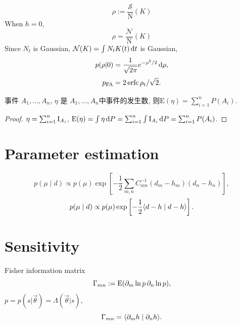 \begin{equation}
    \rho:=\frac{\mathcal{S}}{\mathrm{N}}(K)
\end{equation}
When $h=0$,
\begin{equation}
    \rho=\frac{\mathcal{N}}{\mathrm{N}}(K)
\end{equation}
Since $N_t$ is Gaussian, $\mathcal{N}(K)=\int N_tK(t)\,\mathrm{d} t$ is Gaussian,
\begin{equation}
    p(\rho|0)=\frac{1}{\sqrt{2\pi}}e^{-\rho^2/2}\,\mathrm{d}\rho,
\end{equation}
\begin{equation}
    p_{\text{FA}}=2\operatorname{erfc}{\rho_\text{t}/\sqrt{2}}.
\end{equation}
\begin{theorem}
    事件 $A_1,\dots,A_n$, $\eta$ 是 $A_1,\dots,A_n$中事件的发生数, 则$\text{E}(\eta)=\sum_{i=1}^nP(A_i)$.
\end{theorem}
\begin{proof}
    $\eta=\sum_{i=1}^n\text{I}_{A_i}$, $\text{E}(\eta)=\int\eta\,\mathrm{d} P=\sum_{i=1}^n\int\text{I}_{A_i}\,\mathrm{d} P=\sum_{i=1}^nP(A_i)$.
\end{proof}

\section{Parameter estimation}

\begin{equation}
    p(\mu\mid d)\propto p(\mu)\exp\left[-\frac{1}{2}\sum_{m,n}C_{mn}^{-1}(d_m-h_m)(d_n-h_n)\right],
\end{equation}
\begin{equation}
    p(\mu\mid d)\propto p(\mu)\exp\left[-\frac{1}{2}\langle d-h\mid d-h \rangle\right].
\end{equation}

\section{Sensitivity}

Fisher information matrix
\begin{equation}
    \Gamma_{mn}:=\text{E}(\partial_m \ln p\,\partial_n \ln p),
\end{equation}
$p=p(s|\vec{\theta})=\Lambda(\vec{\theta}|s)$,
\begin{equation}
    \Gamma_{mn}=\langle \partial_m h\mid \partial_n h \rangle.
\end{equation}
